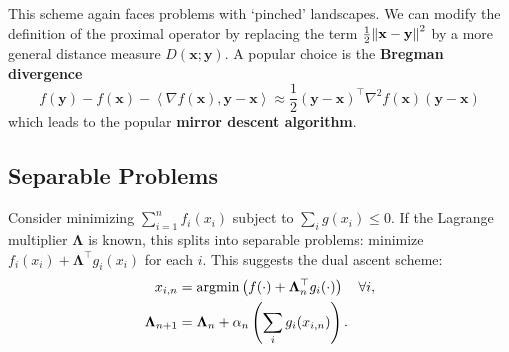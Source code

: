 This scheme again faces problems with `pinched' landscapes. We can modify the definition of the proximal operator by replacing the term $\frac{1}{2} \norm{\mathbf{x} - \mathbf{y}}^2$ by a more general distance measure $D(\mathbf{x}; \mathbf{y})$. A popular choice is the \textbf{Bregman divergence}
\[
    f(\mathbf{y}) - f(\mathbf{x}) - \left\langle \nabla f(\mathbf{x}), \mathbf{y} - \mathbf{x} \right\rangle \approx \frac{1}{2} (\mathbf{y} - \mathbf{x})^{\top} \nabla^2 f(\mathbf{x}) (\mathbf{y} - \mathbf{x})
\]
which leads to the popular \textbf{mirror descent algorithm}.

\subsection*{Separable Problems}

Consider minimizing $\sum_{i=1}^n f_i(x_i)$ subject to $\sum_{i} g(x_i) \leq 0$. If the Lagrange multiplier $\bm{\Lambda}$ is known, this splits into separable problems: minimize $f_i(x_i) + \bm{\Lambda}^{\top} g_i(x_i)$ for each $i$. This suggests the dual ascent scheme:
\begin{align*}
    x_{i,n} &= \operatorname*{argmin} \left( f(\cdot) + \bm{\Lambda}_n^{\top} g_i(\cdot) \right) \quad \forall i, \\
    \bm{\Lambda}_{n+1} &= \bm{\Lambda}_n + \alpha_n \left( \sum_i g_i(x_{i,n}) \right).
\end{align*}